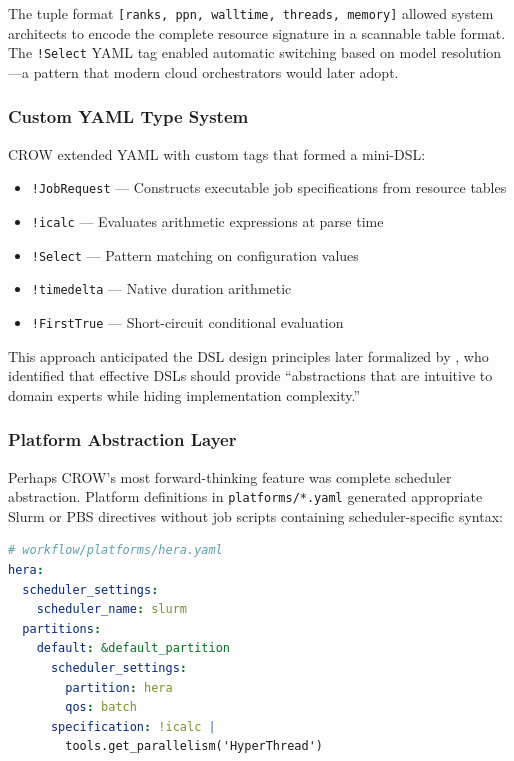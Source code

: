 \documentclass[11pt,twocolumn]{article}
\begin{document}
The tuple format \texttt{[ranks, ppn, walltime, threads, memory]} allowed system architects to encode the complete resource signature in a scannable table format. The \texttt{!Select} YAML tag enabled automatic switching based on model resolution---a pattern that modern cloud orchestrators would later adopt.

\subsubsection{Custom YAML Type System}

CROW extended YAML with custom tags that formed a mini-DSL:
\begin{itemize}
    \item \texttt{!JobRequest} --- Constructs executable job specifications from resource tables
    \item \texttt{!icalc} --- Evaluates arithmetic expressions at parse time
    \item \texttt{!Select} --- Pattern matching on configuration values
    \item \texttt{!timedelta} --- Native duration arithmetic
    \item \texttt{!FirstTrue} --- Short-circuit conditional evaluation
\end{itemize}

This approach anticipated the DSL design principles later formalized by \cite{karsai2014dsl_guidelines}, who identified that effective DSLs should provide ``abstractions that are intuitive to domain experts while hiding implementation complexity.''

\subsubsection{Platform Abstraction Layer}

Perhaps CROW's most forward-thinking feature was complete scheduler abstraction. Platform definitions in \texttt{platforms/*.yaml} generated appropriate Slurm or PBS directives without job scripts containing scheduler-specific syntax:

\begin{lstlisting}[language=YAML, caption={CROW Platform Abstraction}]
# workflow/platforms/hera.yaml
hera:
  scheduler_settings:
    scheduler_name: slurm
  partitions:
    default: &default_partition
      scheduler_settings:
        partition: hera
        qos: batch
      specification: !icalc |
        tools.get_parallelism('HyperThread')
\end{lstlisting}
\end{document}
